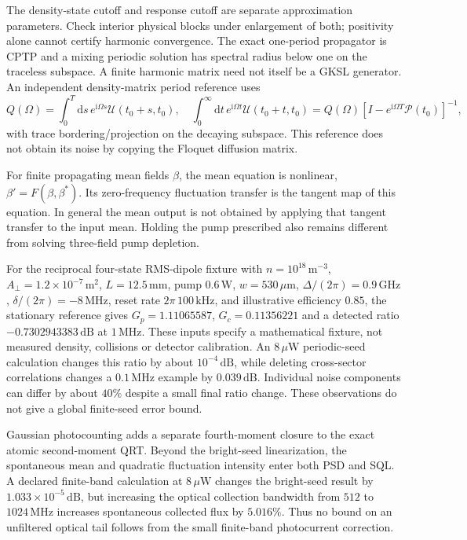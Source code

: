 \documentclass[11pt,a4paper]{article}
\newcommand{\dd}{\mathrm d}
\newcommand{\ii}{\mathrm i}
\newcommand{\GHz}{\,\mathrm{GHz}}
\newcommand{\MHz}{\,\mathrm{MHz}}
\newcommand{\kHz}{\,\mathrm{kHz}}
\newcommand{\dB}{\,\mathrm{dB}}
\begin{document}
The density-state cutoff and response cutoff are separate approximation
parameters. Check interior physical blocks under enlargement of both; positivity
alone cannot certify harmonic convergence. The exact one-period propagator is
CPTP and a mixing periodic solution has spectral radius below one on the
traceless subspace. A finite harmonic matrix need not itself be a GKSL
generator. An independent density-matrix period reference uses
\begin{equation}
 Q(\Omega)=\int_0^T\dd s\,e^{\ii\Omega s}\mathcal U(t_0+s,t_0),\quad
 \int_0^\infty\dd t\,e^{\ii\Omega t}\mathcal U(t_0+t,t_0)
 =Q(\Omega)[I-e^{\ii\Omega T}\mathcal P(t_0)]^{-1},
 \label{eq:gc-period-qrt}
\end{equation}
with trace bordering/projection on the decaying subspace. This reference does
not obtain its noise by copying the Floquet diffusion matrix.

For finite propagating mean fields $\beta$, the mean equation is nonlinear,
$\beta'=F(\beta,\beta^*)$. Its zero-frequency fluctuation transfer is the
tangent map of this equation. In general the mean output is not obtained by
applying that tangent transfer to the input mean. Holding the pump prescribed
also remains different from solving three-field pump depletion.

For the reciprocal four-state RMS-dipole fixture with
$n=10^{18}\,\mathrm{m}^{-3}$, $A_\perp=1.2\times10^{-7}\,\mathrm{m}^2$,
$L=12.5\,\mathrm{mm}$, pump $0.6\,\mathrm W$, $w=530\,\mu\mathrm m$,
$\Delta/(2\pi)=0.9\GHz$, $\delta/(2\pi)=-8\MHz$,
reset rate $2\pi\,100\kHz$, and illustrative efficiency $0.85$, the
stationary reference gives $G_p=1.11065587$, $G_c=0.11356221$ and a detected
ratio $-0.7302943383\dB$ at $1\MHz$. These inputs specify a mathematical
fixture, not measured density, collisions or detector calibration.
An $8\,\mu\mathrm W$ periodic-seed calculation changes this ratio by about
$10^{-4}\dB$, while deleting cross-sector correlations changes a $0.1\MHz$
example by $0.039\dB$. Individual noise components can differ by about
$40\%$ despite a small final ratio change. These observations do not give a
global finite-seed error bound.

Gaussian photocounting adds a separate fourth-moment closure to the exact
atomic second-moment QRT. Beyond the bright-seed linearization, the spontaneous
mean and quadratic fluctuation intensity enter both PSD and SQL. A declared
finite-band calculation at $8\,\mu\mathrm W$ changes the bright-seed result
by $1.033\times10^{-5}\dB$, but increasing the optical collection bandwidth
from $512$ to $1024\MHz$ increases spontaneous collected flux by $5.016\%$.
Thus no bound on an unfiltered optical tail follows from the small finite-band
photocurrent correction.
\end{document}
